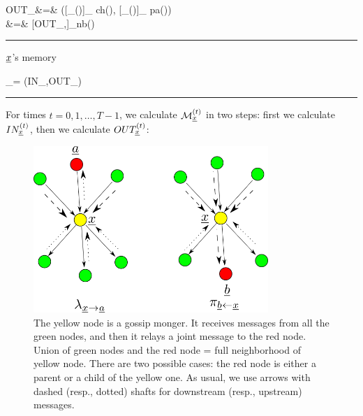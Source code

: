 \beqa
OUT_\rvx&=&
([\pi_{\rvb\larrow\rvx}(\cdot)]_
{\rvb\in ch(\rvx)},
[\lam_{\rvx\rarrow\rva}(\cdot)]_
{\rva\in  pa(\rvx)})
\\
&=&
[OUT_{\rvx,\rvn}]_{\rvn\in nb(\rvx)}
\eeqa
\hrule\noindent
${\underline{x}}$'s memory

\beq
\calm_\rvx =
(IN_\rvx,OUT_\rvx)
\eeq

\hrule

For times $t=0, 1, \dots, T-1$,
 we calculate ${\cal M}^{(t)}_{\underline{x}}$ in
two steps: first we calculate $IN^{(t)}_{\underline{x}}$,
 then
we calculate $OUT^{(t)}_{\underline{x}}$:

\begin{figure}[h!]
\centering
\includegraphics[width=3.5in]
{mpass/mpass-messages.png}
\caption{The yellow
node is a gossip monger.
It receives messages from
all the green nodes,
and then it relays a joint
message to the red node.
Union of green nodes and the red node = full
 neighborhood of yellow node.
There are two possible 
cases: the
red node is either a parent 
or a child of the yellow 
one. As usual, we use arrows with
dashed (resp., dotted) shafts for
downstream (resp., upstream) messages.  } 
\label{fig-messages-gen}
\end{figure}



